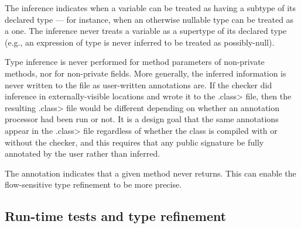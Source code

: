 %
%


The inference indicates when a variable can be treated as having a subtype
of its declared type --- for instance, when an otherwise nullable type can be
treated as a  one.  The inference never treats a variable as
a supertype of its declared type (e.g., an expression of 
type is never inferred to be treated as possibly-null).


Type inference is never performed for method parameters of non-private
methods, nor for non-private fields.
More generally, the inferred information is never written to the
 file as user-written annotations are.
If the checker did inference in externally-visible locations and wrote it
to the \<.class> file, then the resulting \<.class> file would be different
depending on whether an annotation processor had been run or not.  It is a
design goal that the same annotations appear in the \<.class> file
regardless of whether the class is compiled with or without the checker,
and this requires that any public signature be fully annotated by the user
rather than inferred.


The  annotation
indicates that a given method never returns.  This can enable the
flow-sensitive type refinement to be more precise.


\subsection{Run-time tests and type refinement\label{type-refinement-runtime-tests}}

